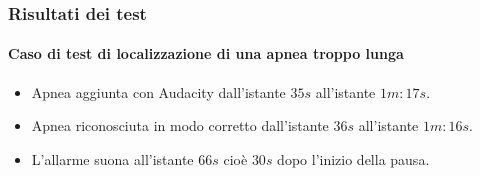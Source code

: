 \begin{frame}
  \frametitle{Risultati dei test}
  \framesubtitle{Caso di test di localizzazione di una apnea troppo lunga}
 
\begin{itemize}
  \item
    Apnea aggiunta con Audacity dall'istante $35s$ all'istante $1m:17s$. 
  \item
    Apnea riconosciuta in modo corretto dall'istante $36s$ all'istante $1m:16s$.
  \item
    L'allarme suona all'istante $66s$ cio\`e $30s$ dopo l'inizio della pausa.
\end{itemize}


\end{frame}
